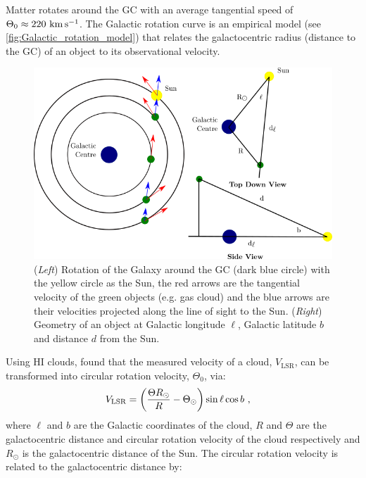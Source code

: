 Matter rotates around the GC with an average tangential speed of $\Theta_0\approx 220~\si{\kilo\meter\per\second}$. The Galactic rotation curve is an empirical model (see \autoref{fig:Galactic_rotation_model}) that relates the galactocentric radius (distance to the GC) of an object to its observational velocity.
\begin{figure}[h!]
	\centering
	\includegraphics[width=1.0\textwidth]{06_Interstellar_Medium/Images/Theory/galaxy_combined.png}
	\caption{(\textit{Left}) Rotation of the Galaxy around the GC (dark blue circle) with the yellow circle as the Sun, the red arrows are the tangential velocity of the green objects (e.g. gas cloud) and the blue arrows are their velocities projected along the line of sight to the Sun. (\textit{Right}) Geometry of an object at Galactic longitude $\ell$, Galactic latitude $b$ and distance $d$ from the Sun.}
	\label{fig:Galactic_rotation_model}
\end{figure}
Using HI clouds, \cite{1993A&A...275...67B} found that the measured velocity of a cloud, $V_\text{LSR}$, can be transformed into circular rotation velocity, $\Theta_0$, via:
\begin{equation}
\begin{aligned}
    V_\text{LSR}&=\qty(\frac{\Theta R_\odot}{R}-\Theta_\odot)\sin\ell \cos b\text{ ,}
\end{aligned} \label{eq:chapter_6_brand_blitz_velocity}
\end{equation}
\noindent where $\ell$ and $b$ are the Galactic coordinates of the cloud, $R$ and $\Theta$ are the galactocentric distance and circular rotation velocity of the cloud respectively and $R_\odot$ is the galactocentric distance of the Sun. The circular rotation velocity is related to the galactocentric distance by:

